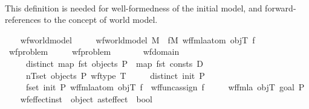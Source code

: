 \begin{isabellebody}
\ \ \ \ \isamarkupfalse%
%
\endisatagproof
{\isafoldproof}%
%
\isadelimproof
%
\endisadelimproof
%
\begin{isamarkuptext}%
This definition is needed for well-formedness of the initial model,
    and forward-references to the concept of world model.%
\end{isamarkuptext}\isamarkuptrue%
\ \ \isamarkupfalse%
\ wf{\isacharunderscore}{\kern0pt}world{\isacharunderscore}{\kern0pt}model\ \isanewline
\ \ \ \ {\isachardoublequoteopen}wf{\isacharunderscore}{\kern0pt}world{\isacharunderscore}{\kern0pt}model\ M\ {\isacharequal}{\kern0pt}\ {\isacharparenleft}{\kern0pt}{\isasymforall}f{\isasymin}M{\isachardot}{\kern0pt}\ wf{\isacharunderscore}{\kern0pt}fmla{\isacharunderscore}{\kern0pt}atom\ objT\ f{\isacharparenright}{\kern0pt}{\isachardoublequoteclose}\ \isanewline
\isanewline
\ \ \isanewline
\ \ \isamarkupfalse%
\ wf{\isacharunderscore}{\kern0pt}problem\ \isanewline
\ \ \ \ {\isachardoublequoteopen}wf{\isacharunderscore}{\kern0pt}problem\ {\isasymequiv}\isanewline
\ \ \ \ \ \ wf{\isacharunderscore}{\kern0pt}domain\isanewline
\ \ \ \ {\isasymand}\ distinct\ {\isacharparenleft}{\kern0pt}map\ fst\ {\isacharparenleft}{\kern0pt}objects\ P{\isacharparenright}{\kern0pt}\ {\isacharat}{\kern0pt}\ map\ fst\ {\isacharparenleft}{\kern0pt}consts\ D{\isacharparenright}{\kern0pt}{\isacharparenright}{\kern0pt}\isanewline
\ \ \ \ {\isasymand}\ {\isacharparenleft}{\kern0pt}{\isasymforall}{\isacharparenleft}{\kern0pt}n{\isacharcomma}{\kern0pt}T{\isacharparenright}{\kern0pt}{\isasymin}set\ {\isacharparenleft}{\kern0pt}objects\ P{\isacharparenright}{\kern0pt}{\isachardot}{\kern0pt}\ wf{\isacharunderscore}{\kern0pt}type\ T{\isacharparenright}{\kern0pt}\isanewline
\ \ \ \ {\isasymand}\ distinct\ {\isacharparenleft}{\kern0pt}init\ P{\isacharparenright}{\kern0pt}\isanewline
\ \ \ \ {\isasymand}\ {\isacharparenleft}{\kern0pt}{\isasymforall}f{\isasymin}set\ {\isacharparenleft}{\kern0pt}init\ P{\isacharparenright}{\kern0pt}{\isachardot}{\kern0pt}\ wf{\isacharunderscore}{\kern0pt}fmla{\isacharunderscore}{\kern0pt}atom\ objT\ f\ {\isasymor}\ wf{\isacharunderscore}{\kern0pt}func{\isacharunderscore}{\kern0pt}assign\ f{\isacharparenright}{\kern0pt}\isanewline
\ \ \ \ {\isasymand}\ wf{\isacharunderscore}{\kern0pt}fmla\ objT\ {\isacharparenleft}{\kern0pt}goal\ P{\isacharparenright}{\kern0pt}{\isachardoublequoteclose}\ \isanewline
\isanewline
\ \ \isamarkupfalse%
\ wf{\isacharunderscore}{\kern0pt}effect{\isacharunderscore}{\kern0pt}inst\ {\isacharcolon}{\kern0pt}{\isacharcolon}{\kern0pt}\ {\isachardoublequoteopen}object\ ast{\isacharunderscore}{\kern0pt}effect\ {\isasymRightarrow}\ bool{\isachardoublequoteclose}\ \isanewline

\end{isabellebody}
